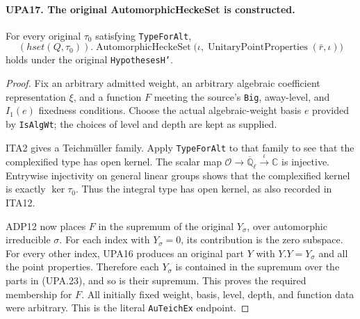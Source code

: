 \paragraph{UPA17. The original AutomorphicHeckeSet is constructed.}
\label{claim:UPA17}
For every original $\tau_0$ satisfying \texttt{TypeForAlt},
\[
 (hset(Q,\tau_0)).\operatorname{AutomorphicHeckeSet}
       \bigl(\iota,\operatorname{UnitaryPointProperties}
                              (\bar r,\iota)\bigr)
 \tag{UPA.23}
\]
holds under the original \texttt{HypothesesH'}.
\begin{proof}
Fix an arbitrary admitted weight, an arbitrary algebraic
coefficient representation $\xi$, and a function $F$
meeting the source's \texttt{Big}, away-level, and
$I_1(e)$ fixedness conditions.  Choose the actual
algebraic-weight basis $e$ provided by
\texttt{IsAlgWt}; the choices of level and depth
are kept as supplied.

ITA2 gives a Teichm\"uller family.  Apply
\texttt{TypeForAlt} to that family to see that the
complexified type has open kernel.  The scalar map
$\mathcal O\to\overline{\mathbb Q}_\ell\xrightarrow{\iota}
\mathbb C$ is injective.  Entrywise injectivity on
general linear groups shows that the complexified
kernel is exactly $\ker\tau_0$.  Thus the integral
type has open kernel, as also recorded in ITA12.

ADP12 now places $F$ in the supremum of the original
$Y_\sigma$, over automorphic irreducible $\sigma$.
For each index with $Y_\sigma=0$, its contribution
is the zero subspace.  For every other index, UPA16
produces an original part $Y$ with $Y.Y=Y_\sigma$
and all the point properties.  Therefore each
$Y_\sigma$ is contained in the supremum over the
parts in (UPA.23), and so is their supremum.
This proves the required membership for $F$.
All initially fixed weight, basis, level, depth,
and function data were arbitrary.  This is the
literal \texttt{AuTeichEx} endpoint.
\end{proof}


